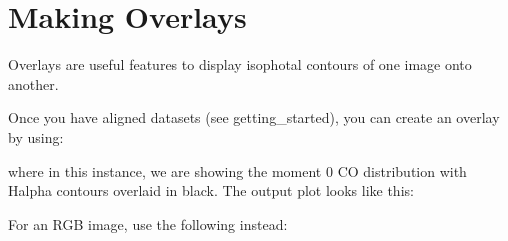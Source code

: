 \documentclass[letterpaper,10pt,english]{sphinxmanual}
\let\sphinxpxdimen\pdfpxdimen\else\newdimen\sphinxpxdimen
\begin{document}
\section{Making Overlays}
\label{\detokenize{overlays:making-overlays}}\label{\detokenize{overlays::doc}}
\sphinxAtStartPar
Overlays are useful features to display isophotal contours of one image onto another.

\sphinxAtStartPar
Once you have aligned datasets (see getting\_started), you can create an overlay by using:

\begin{sphinxVerbatim}[commandchars=\\\{\}]
 \PYG{p}{[}\PYG{p}{]}
                               \PYG{p}{[}   \PYG{p}{]}
\end{sphinxVerbatim}

\sphinxAtStartPar
where in this instance, we are showing the moment 0 CO distribution with H\sphinxhyphen{}alpha contours overlaid in black.
The output plot looks like this:

\noindent\sphinxincludegraphics[width=600\sphinxpxdimen]{{test_overlay}.png}

\sphinxAtStartPar
For an RGB image, use the following instead:

\begin{sphinxVerbatim}[commandchars=\\\{\}]
    
 
                             \PYG{p}{[}   \PYG{p}{]}  
\end{sphinxVerbatim}
\end{document}
